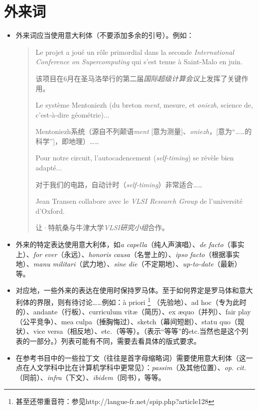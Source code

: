 \section{外来词}

\begin{itemize}
    \item 外来词应当使用意大利体（不要添加多余的引号）。例如：
    \begin{quote}
        Le projet a joué un rôle primordial dans la seconde \emph{International Conference on Supercomputing} qui s'est tenue à Saint-Malo en juin.
        \begin{bil}
            该项目在6月在圣马洛举行的第二届\emph{国际超级计算会议}上发挥了关键作用。
        \end{bil}

        Le système Mentoniezh (du breton \emph{ment}, mesure, et \emph{oniezh}, science de, c'est-à-dire géométrie)...
        \begin{bil}
            Mentoniezh系统（源自不列颠语\emph{ment} [意为测量]、\emph{oniezh}，[意为``……的科学'']，即地理）……
        \end{bil}

        Pour notre circuit, l'autocadencement (\emph{self-timing}) se révèle bien adapté...
        \begin{bil}
            对于我们的电路，自动计时（\emph{self-timing}）非常适合……
        \end{bil}

        Jean Transen collabore avec le \emph{VLSI Research Group} de l'université d'Oxford.
        \begin{bil}
            让·特航桑与牛津大学\emph{VLSI研究小组}合作。
        \end{bil}
    \end{quote}
    \item 外来的特定表达使用意大利体，如\emph{a capella}（纯人声演唱）、\emph{de facto}（事实上）、\emph{for ever}（永远）、\emph{honoris causa}（名誉上的）、\emph{ipso facto}（根据事实地）、\emph{manu militari}（武力地）、\emph{sine die}（不定期地）、\emph{up-to-date}（最新）等。
    \item 对应地，一些外来的表达在使用时保持罗马体。至于如何界定是罗马体和意大利体的界限，则有待讨论……例如：à priori
        \footnote{甚至还带重音符：参见http://langue-fr.net/spip.php?article128}
    （先验地）、ad hoc（专为此时的）、andante（行板）、curriculum vitæ（简历）、ex æquo（并列）、fair play（公平竞争）、mea culpa（捶胸悔过）、sketch（幕间短剧）、statu quo（现状）、vice versa（相反地）、etc.（等等）。（表示``等等''的etc.当然也是这个列表的一部分。）列表可能有不同，需要去看具体的版式要求。
    \item 在参考书目中的一些拉丁文（往往是首字母缩略词）需要使用意大利体（这一点在人文学科中比在计算机学科中更常见）：\emph{passim}（及其他位置）、\emph{op. cit.}（同前）、\emph{infra}（下文）、\emph{ibidem}（同书），等等。
\end{itemize}

